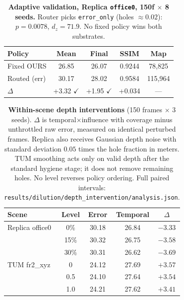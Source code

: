 \documentclass[10pt,twocolumn,letterpaper]{article}
\begin{document}
\begin{table}[tbp]
\centering
\footnotesize\setlength{\tabcolsep}{3pt}
\begin{tabular}{lcccc}
\toprule
\textbf{Policy} & \textbf{Mean} & \textbf{Final} & \textbf{SSIM} & \textbf{Map} \\
\midrule
Fixed OURS & 26.85 & 26.07 & 0.9244 & 78,825 \\
Routed (err) & 30.17 & 28.02 & 0.9584 & 115,964 \\
\midrule
$\Delta$ & +3.32 $\checkmark$ & +1.95 $\checkmark$ & +0.034 & --- \\
\bottomrule
\end{tabular}
\caption{\textbf{Adaptive validation, Replica \texttt{office0}, 150f $\times$ 8 seeds.} Router picks \texttt{error\_only} (holes $\approx 0.02$): $p = 0.0078$, $d_z = 71.9$. No fixed policy wins both substrates.}
\label{tab:adaptive}
\end{table}

\begin{table}[tbp]
\centering
\footnotesize\setlength{\tabcolsep}{2pt}
\begin{tabular}{lcccc}
\toprule
\textbf{Scene} & \textbf{Level} & \textbf{Error} & \textbf{Temporal} & \textbf{$\Delta$} \\
\midrule
Replica office0 & 0\% & 30.18 & 26.84 & $-3.33$ \\
 & 15\% & 30.32 & 26.75 & $-3.58$ \\
 & 30\% & 30.31 & 26.62 & $-3.69$ \\
\midrule
TUM fr2\_xyz & 0 & 24.12 & 27.69 & $+3.57$ \\
 & 0.5 & 24.10 & 27.64 & $+3.54$ \\
 & 1.0 & 24.21 & 27.62 & $+3.41$ \\
\bottomrule
\end{tabular}
\caption{\textbf{Within-scene depth interventions} (150 frames $\times$ 3 seeds). $\Delta$ is temporal$\times$influence with coverage minus unthrottled raw error, measured on identical perturbed frames. Replica also receives Gaussian depth noise with standard deviation $0.05$ times the hole fraction in meters. TUM smoothing acts only on valid depth after the standard hygiene stage; it does not remove remaining holes. No level reverses policy ordering. Full paired intervals: \texttt{results/dilution/depth\_intervention/analysis.json}.}
\label{tab:depth_intervention}
\end{table}
\end{document}
